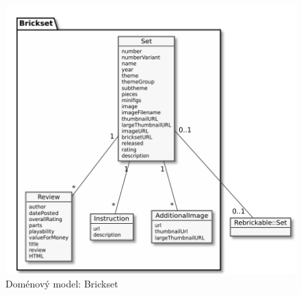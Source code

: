 \begin{figure}[htbp]
    \centering
    \includegraphics[width=\textwidth,height=\textheight,keepaspectratio]{pdfs/brickset}
    \caption{Doménový model: Brickset \label{diagram-domenovy-brickset}}
\end{figure}